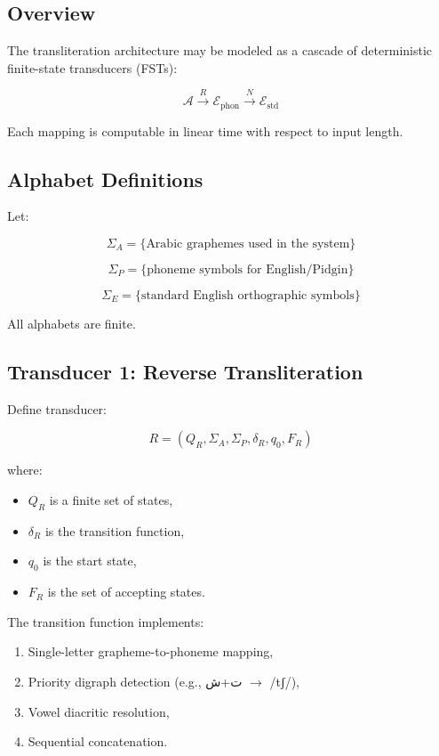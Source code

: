 \documentclass[12pt]{article}
\newcommand{\AR}[1]{\foreignlanguage{arabic}{#1}}
\begin{document}
\subsection{Overview}

The transliteration architecture may be modeled as a cascade of deterministic finite-state transducers (FSTs):

\[
\mathcal{A} \xrightarrow{R} \mathcal{E}_{\text{phon}} \xrightarrow{N} \mathcal{E}_{\text{std}}
\]

Each mapping is computable in linear time with respect to input length.

\subsection{Alphabet Definitions}

Let:

\[
\Sigma_A = \{\text{Arabic graphemes used in the system}\}
\]

\[
\Sigma_P = \{\text{phoneme symbols for English/Pidgin}\}
\]

\[
\Sigma_E = \{\text{standard English orthographic symbols}\}
\]

All alphabets are finite.

\subsection{Transducer 1: Reverse Transliteration}

Define transducer:

\[
R = (Q_R, \Sigma_A, \Sigma_P, \delta_R, q_0, F_R)
\]

where:

\begin{itemize}
\item $Q_R$ is a finite set of states,
\item $\delta_R$ is the transition function,
\item $q_0$ is the start state,
\item $F_R$ is the set of accepting states.
\end{itemize}

The transition function implements:

\begin{enumerate}
\item Single-letter grapheme-to-phoneme mapping,
\item Priority digraph detection (e.g., \AR{ت}+\AR{ش} $\rightarrow$ /tʃ/),
\item Vowel diacritic resolution,
\item Sequential concatenation.
\end{enumerate}
\end{document}
